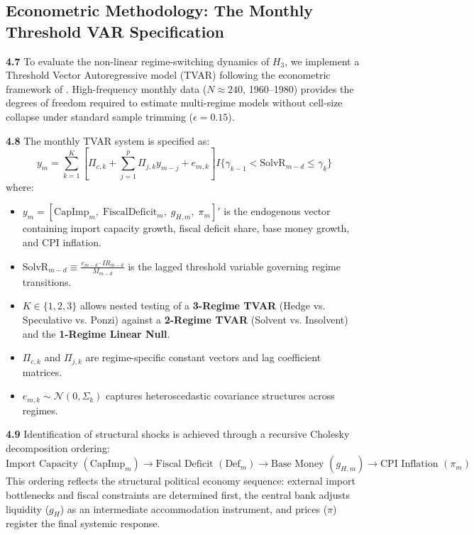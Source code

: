 \subsection{Econometric Methodology: The Monthly Threshold VAR Specification}
\label{sec:tvar_methodology}

\textbf{4.7} To evaluate the non-linear regime-switching dynamics of $H_3$, we implement a Threshold Vector Autoregressive model (TVAR) following the econometric framework of \citet{ClavijoCortesKappesRochon2025}. High-frequency monthly data ($N \approx 240$, 1960--1980) provides the degrees of freedom required to estimate multi-regime models without cell-size collapse under standard sample trimming ($\epsilon = 0.15$).

\textbf{4.8} The monthly TVAR system is specified as:
\begin{equation}
y_m = \sum_{k=1}^K \left[\Pi_{c,k} + \sum_{j=1}^p \Pi_{j,k} y_{m-j} + e_{m,k}\right] I\{\gamma_{k-1} < \text{SolvR}_{m-d} \le \gamma_k\}
\label{eq:tvar_model}
\end{equation}
where:
\begin{itemize}[leftmargin=2em]
	\item $y_m = [\text{CapImp}_m,\; \text{FiscalDeficit}_m,\; g_{H,m},\; \pi_m]'$ is the endogenous vector containing import capacity growth, fiscal deficit share, base money growth, and CPI inflation.
	\item $\text{SolvR}_{m-d} \equiv \frac{e_{m-d} \cdot IR_{m-d}}{M_{m-d}}$ is the lagged threshold variable governing regime transitions.
	\item $K \in \{1, 2, 3\}$ allows nested testing of a \textbf{3-Regime TVAR} (Hedge vs. Speculative vs. Ponzi) against a \textbf{2-Regime TVAR} (Solvent vs. Insolvent) and the \textbf{1-Regime Linear Null}.
	\item $\Pi_{c,k}$ and $\Pi_{j,k}$ are regime-specific constant vectors and lag coefficient matrices.
	\item $e_{m,k} \sim \mathcal{N}(0, \Sigma_k)$ captures heteroscedastic covariance structures across regimes.
\end{itemize}

\textbf{4.9} Identification of structural shocks is achieved through a recursive Cholesky decomposition ordering:
\begin{equation}
\text{Import Capacity } (\text{CapImp}_m) \longrightarrow \text{Fiscal Deficit } (\text{Def}_m) \longrightarrow \text{Base Money } (g_{H,m}) \longrightarrow \text{CPI Inflation } (\pi_m)
\end{equation}
This ordering reflects the structural political economy sequence: external import bottlenecks and fiscal constraints are determined first, the central bank adjusts liquidity ($g_H$) as an intermediate accommodation instrument, and prices ($\pi$) register the final systemic response.

